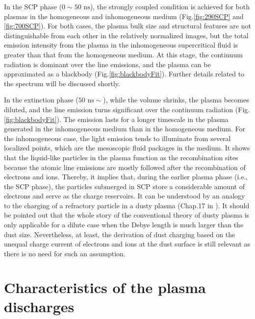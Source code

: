 In the SCP phase ($0 \sim 50 \text{ ns}$), the strongly coupled condition is achieved for both plasmas in the homogeneous and inhomogeneous medium (Fig.\ref{fig:290SCP} and \ref{fig:700SCP}). For both cases, the plasma bulk size and structural features are not distinguishable from each other in the relatively normalized images, but the total emission intensity from the plasma in the inhomogeneous supercritical fluid is greater than that from the homogeneous medium. At this stage, the continuum radiation is dominant over the line emissions, and the plasma can be approximated as a blackbody (Fig.\ref{fig:blackbodyFit}). Further details related to the spectrum will be discussed shortly.

In the extinction phase ($50 \text{ ns} \sim$), while the volume shrinks, the plasma becomes diluted, and the line emission turns significant over the continuum radiation (Fig.\ref{fig:blackbodyFit}). The emission lasts for a longer timescale in the plasma generated in the inhomogeneous medium than in the homogeneous medium. For the inhomogeneous case, the light emission tends to illuminate from several localized points, which are the mesoscopic fluid packages in the medium. It shows that the liquid-like particles in the plasma function as the recombination sites because the atomic line emissions are mostly followed after the recombination of electrons and ions. Thereby, it implies that, during the earlier plasma phase (i.e., the SCP phase), the particles submerged in SCP store a considerable amount of electrons and serve as the charge reservoirs. It can be understood by an analogy to the charging of a refractory particle in a dusty plasma (Chap.17 in \cite{bellan2008fundamentals}). It should be pointed out that the whole story of the conventional theory of dusty plasma is only applicable for a dilute case when the Debye length is much larger than the dust size. Nevertheless, at least, the derivation of dust charging based on the unequal charge current of electrons and ions at the dust surface is still relevant as there is no need for such an assumption.



\section{Characteristics of the plasma discharges}
\label{sec:ch4-3}

